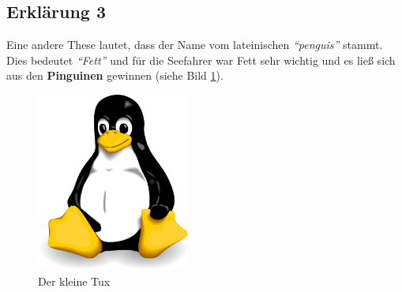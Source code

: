 \subsection{Erklärung 3}
Eine andere These lautet, dass der Name vom lateinischen \emph{"`penguis"'} stammt. Dies bedeutet \emph{"`Fett"'} und für die Seefahrer war Fett sehr wichtig und es ließ sich aus den \textbf{Pinguinen} gewinnen (siehe Bild \ref{img:tux}).

\begin{figure}[H]
\begin{center}
\includegraphics[width=5cm]{bilder/tux.png}
\caption{Der kleine Tux}
\label{img:tux}
\end{center}
\end{figure}


